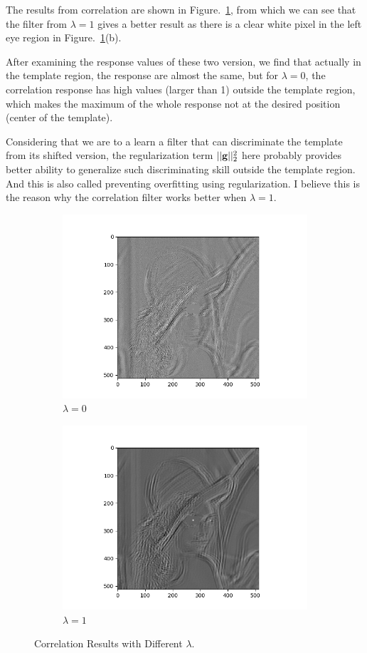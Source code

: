 \documentclass[11pt]{article}
\begin{document}
The results from correlation are shown in Figure.~\ref{fig:q4.3.2}, from which we can see that the filter from $\lambda=1$ gives a better result as there is a clear white pixel in the left eye region in Figure.~\ref{fig:q4.3.2}(b).

After examining the response values of these two version, we find that actually in the template region, the response are almost the same, but for $\lambda=0$, the correlation response has high values (larger than 1) outside the template region, which makes the maximum of the whole response not at the desired position (center of the template).

Considering that we are to a learn a filter that can discriminate the template from its shifted version, the regularization term $||\mathbf{g}||^2_2$ here probably provides better ability to generalize such discriminating skill outside the template region. And this is also called preventing overfitting using regularization. I believe this is the reason why the correlation filter works better when $\lambda=1$.

\begin{figure}[h!]
    \begin{subfigure}{.49\textwidth}
      \centering
      \includegraphics[width=.8\linewidth]{../results/q4_3_lambda_0_corr.png}
      \caption{$\lambda=0$}
    \end{subfigure}
    \begin{subfigure}{.49\textwidth}
      \centering
      \includegraphics[width=.8\linewidth]{../results/q4_3_lambda_1_corr.png}
      \caption{$\lambda=1$}
    \end{subfigure}
    \caption{Correlation Results with Different $\lambda$. }
    \label{fig:q4.3.2}
\end{figure}
\end{document}
